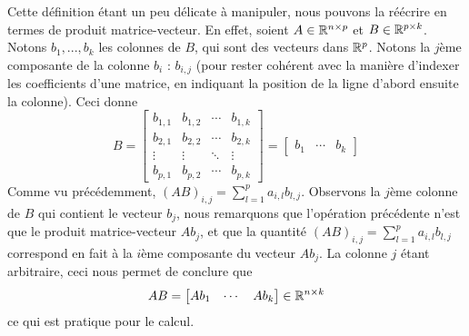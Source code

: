 \noindent Cette définition étant un peu délicate à manipuler, nous pouvons la réécrire en termes de produit matrice-vecteur. En effet, soient $A \in \mathbb{R}^{n \times p}$ et $B\in \mathbb{R}^{p \times k}$. Notons $b_1, ..., b_k$ les colonnes de $B$, qui sont des vecteurs dans $\mathbb{R}^p$. Notons la $j$ème composante de la colonne $b_i$ : $b_{i,j}$ (pour rester cohérent avec la manière d'indexer les coefficients d'une matrice, en indiquant la position de la ligne d'abord ensuite la colonne). Ceci donne 
$$B = 
\begin{bmatrix} 
b_{1,1} & b_{1,2} & \cdots & b_{1,k} \\
b_{2,1} & b_{2,2} & \cdots & b_{2,k} \\
\vdots & \vdots & \ddots & \vdots \\
b_{p,1} & b_{p,2} & \cdots & b_{p,k}
\end{bmatrix} = \begin{bmatrix} b_1 & \cdots & b_k \end{bmatrix}$$
Comme vu précédemment, $\displaystyle (AB)_{i,j} = \sum_{l=1}^{p} a_{i,l} b_{l,j}$. Observons la $j$ème colonne de $B$ qui contient le vecteur $b_j$, nous remarquons que l'opération précédente n'est que le produit matrice-vecteur $A b_j$, et que la quantité $\displaystyle (AB)_{i,j} = \sum_{l=1}^{p} a_{i,l} b_{l,j}$ correspond en fait à la $i$ème composante du vecteur $Ab_j$. La colonne $j$ étant arbitraire, ceci nous permet de conclure que 
$$AB = \begin{bmatrix} Ab_1 & \cdots & Ab_k \end{bmatrix} \in \mathbb{R}^{n \times k}$$ 
ce qui est pratique pour le calcul. \\

